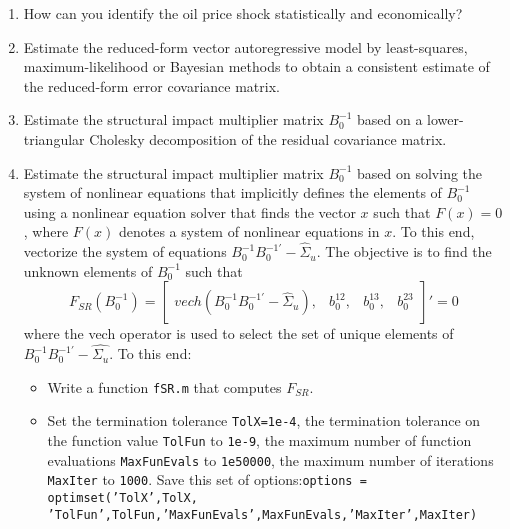 \documentclass[a4paper]{scrartcl}
\begin{document}
    \begin{enumerate}
        \item How can you identify the oil price shock statistically and economically?
              
        \item Estimate the reduced-form vector autoregressive model by least-squares, maximum-likelihood or Bayesian methods to obtain a consistent estimate of the reduced-form error covariance matrix.
        \item Estimate the structural impact multiplier matrix $B_0^{-1}$ based on a lower-triangular Cholesky decomposition of the residual covariance matrix.
        \item Estimate the structural impact multiplier matrix $B_0^{-1}$ based on solving the system of nonlinear equations that implicitly defines the elements of $B_0^{-1}$ using a nonlinear equation solver that finds the vector $x$ such that $F(x)=0$, where $F(x)$ denotes a system of nonlinear equations in $x$. To this end, vectorize the system of equations $B_0^{-1} B_{0}^{-1'} - \hat{\Sigma}_u$. The objective is to find the unknown elements of $B_0^{-1}$ such that
              $$ F_{SR}(B_0^{-1}) = \begin{bmatrix} vech\left(B_0^{-1} B_0^{-1'} - \hat{\Sigma}_u\right),&b_0^{12},&b_0^{13},&b_0^{23}\end{bmatrix}'=0$$
              where the vech operator is used to select the set of unique elements of $B_0^{-1}B_0^{-1'} - \hat{\Sigma_u}$. To this end:
              \begin{itemize}
                  \item Write a function \texttt{fSR.m} that computes $F_{SR}$.
                  \item Set the termination tolerance \texttt{TolX=1e-4}, the termination tolerance on the function value \texttt{TolFun} to \texttt{1e-9}, the maximum number of function evaluations \texttt{MaxFunEvals} to \texttt{1e50000}, the maximum number of iterations \texttt{MaxIter} to \texttt{1000}. Save this set of options:\texttt{options = optimset('TolX',TolX,\\'TolFun',TolFun,'MaxFunEvals',MaxFunEvals,'MaxIter',MaxIter)}

\end{itemize}
\end{enumerate}
\end{document}
